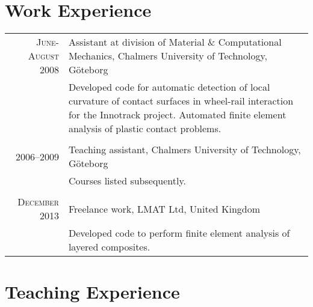 \documentclass[a4paper,10pt]{article} %
\begin{document}

\section{Work Experience}

\begin{tabular}{r|p{11cm}}
\textsc{June-August 2008} & Assistant at division of Material \& Computational Mechanics, Chalmers University of Technology, Göteborg\\
& \footnotesize{Developed code for automatic detection of local curvature of contact surfaces in wheel-rail interaction for the Innotrack project. Automated finite element analysis of plastic contact problems.}\\
\multicolumn{2}{c}{} \\
\textsc{2006--2009} & Teaching assistant, Chalmers University of Technology, Göteborg\\
& \footnotesize{Courses listed subsequently.}\\
\multicolumn{2}{c}{} \\
\textsc{December 2013} & Freelance work, LMAT Ltd, United Kingdom\\
& \footnotesize{Developed code to perform finite element analysis of layered composites.}\\

\end{tabular}


\section{Teaching Experience}
\end{document}
